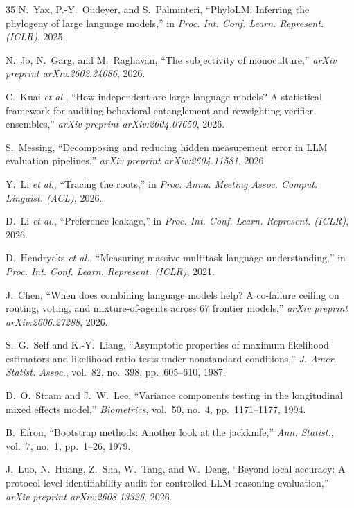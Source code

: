 \documentclass{ieeeaccess}
\theoremstyle{definition}
\theoremstyle{plain}
\begin{document}
\begin{thebibliography}{35}
 N.~Yax, P.-Y.~Oudeyer, and S.~Palminteri, ``PhyloLM:
Inferring the phylogeny of large language models,'' in \emph{Proc. Int. Conf.
Learn. Represent. (ICLR)}, 2025.

 N.~Jo, N.~Garg, and M.~Raghavan, ``The subjectivity of
monoculture,'' \emph{arXiv preprint arXiv:2602.24086}, 2026.

 C.~Kuai \emph{et al.}, ``How independent are large language
models? A statistical framework for auditing behavioral entanglement and
reweighting verifier ensembles,'' \emph{arXiv preprint arXiv:2604.07650}, 2026.

 S.~Messing, ``Decomposing and reducing hidden measurement
error in LLM evaluation pipelines,'' \emph{arXiv preprint arXiv:2604.11581}, 2026.

 Y.~Li \emph{et al.}, ``Tracing the roots,'' in \emph{Proc.
Annu. Meeting Assoc. Comput. Linguist. (ACL)}, 2026.

 D.~Li \emph{et al.}, ``Preference leakage,'' in \emph{Proc.
Int. Conf. Learn. Represent. (ICLR)}, 2026.

 D.~Hendrycks \emph{et al.}, ``Measuring massive multitask
language understanding,'' in \emph{Proc. Int. Conf. Learn. Represent. (ICLR)},
2021.

 J.~Chen, ``When does combining language models help? A
co-failure ceiling on routing, voting, and mixture-of-agents across 67 frontier
models,'' \emph{arXiv preprint arXiv:2606.27288}, 2026.

 S.~G.~Self and K.-Y.~Liang, ``Asymptotic properties of
maximum likelihood estimators and likelihood ratio tests under nonstandard
conditions,'' \emph{J. Amer. Statist. Assoc.}, vol.~82, no.~398, pp.~605--610,
1987.

 D.~O.~Stram and J.~W.~Lee, ``Variance components testing in
the longitudinal mixed effects model,'' \emph{Biometrics}, vol.~50, no.~4,
pp.~1171--1177, 1994.

 B.~Efron, ``Bootstrap methods: Another look at the
jackknife,'' \emph{Ann. Statist.}, vol.~7, no.~1, pp.~1--26, 1979.

 J.~Luo, N.~Huang, Z.~Sha, W.~Tang, and W.~Deng, ``Beyond local accuracy: A protocol-level identifiability audit for controlled LLM reasoning evaluation,'' \emph{arXiv preprint arXiv:2608.13326}, 2026.

\end{thebibliography}
\end{document}
